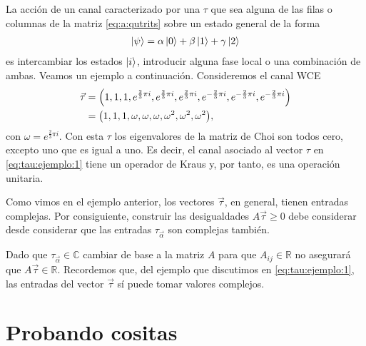 La acción de un canal caracterizado por una $\tau$ que sea alguna
de las filas o columnas de la matriz \eqref{eq:a:qutrits} 
sobre un estado general de la forma
\begin{align}
\ket{\psi} = \alpha \ket{0} + \beta \ket{1} + \gamma \ket{2}
\end{align}
es intercambiar los estados $\ket{i}$, introducir alguna fase
local o una combinación de ambas. Veamos un ejemplo a continuación.
Consideremos el canal WCE 
\begin{align}
\vec \tau &= \qty(1, 1, 1,
e^{\frac{2}{3}\pi i}, e^{\frac{2}{3}\pi i}, e^{\frac{2}{3}\pi i},
e^{-\frac{2}{3}\pi i}, e^{-\frac{2}{3}\pi i}, e^{-\frac{2}{3}\pi i}) \\
&=\qty(1,1,1,\omega,\omega,\omega,\omega^2,\omega^2,\omega^2),
\label{eq:tau:ejemplo:1}
\end{align}
con $\omega=e^{\frac{2}{3}\pi i}$. Con esta $\tau$ los 
eigenvalores de la matriz de Choi son todos cero, excepto 
uno que es igual a uno. Es decir, el canal asociado al 
vector $\tau$ en \eqref{eq:tau:ejemplo:1} tiene un operador 
de Kraus y, por tanto, es una operación unitaria. 

Como vimos en el ejemplo anterior, los vectores $\vec \tau$,
en general, tienen entradas complejas. Por consiguiente, 
construir las desigualdades $A\vec \tau \geq 0$ debe considerar
desde considerar que las entradas $\tau_{\vec \alpha}$ son 
complejas también.

Dado que $\tau_{\vec \alpha}\in \mathbb{C}$ cambiar de base 
a la matriz $A$ para que $A_{ij}\in \mathbb{R}$ no asegurará 
que $A\vec \tau \in \mathbb{R}$. Recordemos que, del ejemplo
que discutimos en \eqref{eq:tau:ejemplo:1}, las entradas 
del vector $\vec \tau$ sí puede tomar valores complejos.

\section{Probando cositas}